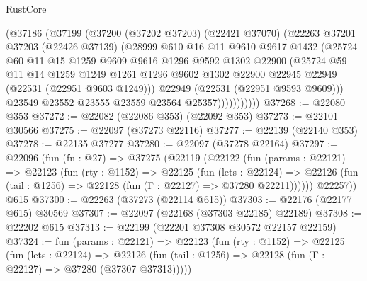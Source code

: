 \begin{lexlean}{RustCore}
\begin{coremodule}
                (@37186
                  (@37199
                    (@37200
                      (@37202 @37203)
                      (@22421 @37070)
                      (@22263
                        @37201
                        @37203
                        (@22426 @37139)
                        (@28999
                          @610
                          @16
                          @11
                          @9610
                          @9617
                          @1432
                          (@25724
                            @60
                            @11
                            @15
                            @1259
                            @9609
                            @9616
                            @1296
                            @9592
                            @1302
                            @22900
                            (@25724
                              @59
                              @11
                              @14
                              @1259
                              @1249
                              @1261
                              @1296
                              @9602
                              @1302
                              @22900
                              @22945
                              @22949
                              (@22531 (@22951 @9603 @1249)))
                            @22949
                            (@22531 (@22951 @9593 @9609)))
                          @23549
                          @23552
                          @23555
                          @23559
                          @23564
                          @25357)))))))))))
@37268 := @22080 @353
@37272 := @22082 (@22086 @353) (@22092 @353)
@37273 := @22101 @30566
@37275 := @22097 (@37273 @22116)
@37277 := @22139 (@22140 @353)
@37278 := @22135 @37277
@37280 := @22097 (@37278 @22164)
@37297 := @22096
    (fun (fn : @27) =>
    @37275
      (@22119
        (@22122
          (fun (params : @22121) =>
          @22123
            (fun (rty : @1152) =>
            @22125
              (fun (lets : @22124) =>
              @22126 (fun (tail : @1256) => @22128 (fun (Γ : @22127) => @37280 @22211))))))
        @22257))
    @615
@37300 := @22263 (@37273 (@22114 @615))
@37303 := @22176 (@22177 @615) @30569
@37307 := @22097 (@22168 (@37303 @22185) @22189)
@37308 := @22202 @615
@37313 := @22199 (@22201 @37308 @30572 @22157 @22159)
@37324 := fun (params : @22121) =>
  @22123
    (fun (rty : @1152) =>
    @22125
      (fun (lets : @22124) =>
      @22126 (fun (tail : @1256) => @22128 (fun (Γ : @22127) => @37280 (@37307 @37313)))))

\end{coremodule}
\end{lexlean}
